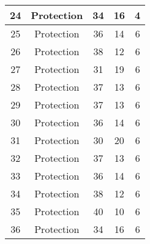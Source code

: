 \documentclass[results.tex]{subfiles}
\begin{document}
\begin{center}
\begin{tabular}{| c || c | c | c | c |}
            \hline
            24                      & Protection                   & 34                     & 16                      & 4                    \\
            \hline
            25                      & Protection                   & 36                     & 14                      & 6                    \\
            \hline
            26                      & Protection                   & 38                     & 12                      & 6                    \\
            \hline
            27                      & Protection                   & 31                     & 19                      & 6                    \\
            \hline
            28                      & Protection                   & 37                     & 13                      & 6                    \\
            \hline
            29                      & Protection                   & 37                     & 13                      & 6                    \\
            \hline
            30                      & Protection                   & 36                     & 14                      & 6                    \\
            \hline
            31                      & Protection                   & 30                     & 20                      & 6                    \\
            \hline
            32                      & Protection                   & 37                     & 13                      & 6                    \\
            \hline
            33                      & Protection                   & 36                     & 14                      & 6                    \\
            \hline
            34                      & Protection                   & 38                     & 12                      & 6                    \\
            \hline
            35                      & Protection                   & 40                     & 10                      & 6                    \\
            \hline
            36                      & Protection                   & 34                     & 16                      & 6                    \\

\end{tabular}
\end{center}
\end{document}
